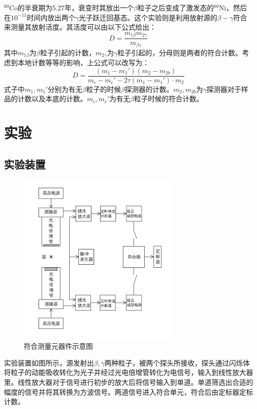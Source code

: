\documentclass[aps,pre,12pt,preprint,onecolumn,showpacs,showkeys,UTF8]{revtex4-1}
\begin{document}
$^{60}$Co的半衰期为5.27年，衰变时其放出一个$\beta$粒子之后变成了激发态的$^{60}$Ni，然后在$10^{-11}$时间内放出两个$\gamma$光子跃迁回基态。这个实验则是利用放射源的$\beta-\gamma$符合来测量其放射活度。其活度可以由以下公式给出：
\begin{equation}
	D=\frac{m_{1\beta}m_{2\gamma}}{m_{\beta\gamma}}
\end{equation}
其中$m_{1\beta}$为$\beta$粒子引起的计数，$m_{2\gamma}$为$\gamma$粒子引起的，分母则是两者的符合计数。考虑到本地计数等等的影响，上公式可以改写为：
\begin{equation}
	D=\frac{(m_1-m_1')(m_2-m_{2b})}{m_c-m_c'-2\tau(m_1-m_1')\cdot m_2}
\end{equation}
式子中$m_1,m_1'$分别为有无$\beta$粒子的时候$\beta$探测器的计数。$m_2,m_{2b}$为$\gamma$探测器对于样品的计数以及本底的计数。$m_c,m_c'$为有无$\beta$粒子时候的符合计数。

\section{实验}
\subsection{实验装置}
\begin{figure}[h]
	\begin{center}
		\includegraphics[width=0.7\textwidth]{pic1.png}
		\caption{\label{fig:exp1}符合测量元器件示意图}
	\end{center}
\end{figure}

实验装置如图所示，源发射出$\beta,\gamma$两种粒子，被两个探头所接收，探头通过闪烁体将粒子的动能吸收转化为光子并经过光电倍增管转化为电信号，输入到线性放大器里。线性放大器对于信号进行初步的放大后将信号输入到单道。单道筛选出合适的幅度的信号并将其转换为方波信号。两道信号进入符合单元，符合后由定标器定标计数。
\end{document}

